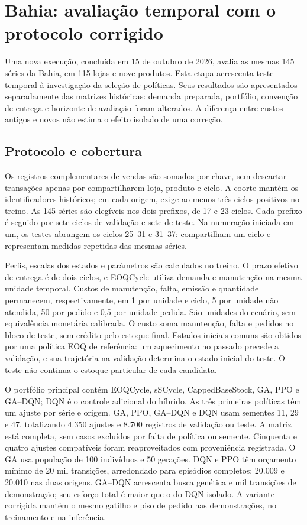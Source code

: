 \section{Bahia: avaliação temporal com o protocolo corrigido}
\label{sec:ba2026}

Uma nova execução, concluída em 15 de outubro de 2026, avalia as mesmas 145 séries da Bahia, em 115 lojas e nove produtos. Esta etapa acrescenta teste temporal à investigação da seleção de políticas. Seus resultados são apresentados separadamente das matrizes históricas: demanda preparada, portfólio, convenção de entrega e horizonte de avaliação foram alterados. A diferença entre custos antigos e novos não estima o efeito isolado de uma correção.

\subsection{Protocolo e cobertura}

Os registros complementares de vendas são somados por chave, sem descartar transações apenas por compartilharem loja, produto e ciclo. A coorte mantém os identificadores históricos; em cada origem, exige ao menos três ciclos positivos no treino. As 145 séries são elegíveis nos dois prefixos, de 17 e 23 ciclos. Cada prefixo é seguido por sete ciclos de validação e sete de teste. Na numeração iniciada em um, os testes abrangem os ciclos 25--31 e 31--37: compartilham um ciclo e representam medidas repetidas das mesmas séries.

Perfis, escalas dos estados e parâmetros são calculados no treino. O prazo efetivo de entrega é de dois ciclos, e EOQCycle utiliza demanda e manutenção na mesma unidade temporal. Custos de manutenção, falta, emissão e quantidade permanecem, respectivamente, em 1 por unidade e ciclo, 5 por unidade não atendida, 50 por pedido e 0,5 por unidade pedida. São unidades do cenário, sem equivalência monetária calibrada. O custo soma manutenção, falta e pedidos no bloco de teste, sem crédito pelo estoque final. Estados iniciais comuns são obtidos por uma política EOQ de referência: um aquecimento no passado precede a validação, e sua trajetória na validação determina o estado inicial do teste. O teste não continua o estoque particular de cada candidata.

O portfólio principal contém EOQCycle, sSCycle, CappedBaseStock, GA, PPO e GA--DQN; DQN é o controle adicional do híbrido. As três primeiras políticas têm um ajuste por série e origem. GA, PPO, GA--DQN e DQN usam sementes 11, 29 e 47, totalizando 4.350 ajustes e 8.700 registros de validação ou teste. A matriz está completa, sem casos excluídos por falta de política ou semente. Cinquenta e quatro ajustes compatíveis foram reaproveitados com proveniência registrada. O GA usa população de 100 indivíduos e 50 gerações. DQN e PPO têm orçamento mínimo de 20 mil transições, arredondado para episódios completos: 20.009 e 20.010 nas duas origens. GA--DQN acrescenta busca genética e mil transições de demonstração; seu esforço total é maior que o do DQN isolado. A variante corrigida mantém o mesmo gatilho e piso de pedido nas demonstrações, no treinamento e na inferência.

